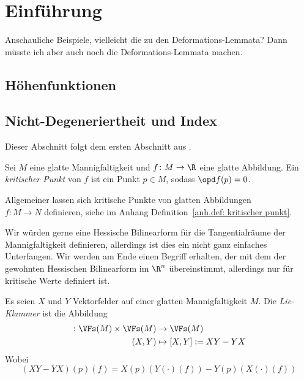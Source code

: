 \chapter{Einführung}

Anschauliche Beispiele, vielleicht die zu den Deformations-Lemmata? Dann müsste
ich aber auch noch die Deformations-Lemmata machen.

\section{Höhenfunktionen}

\section{Nicht-Degeneriertheit und Index}

Dieser Abschnitt folgt dem ersten Abschnitt aus \cite{milnor}.

\begin{definition}
    \label{def: kritischer Punkt}
    Sei $M$ eine glatte Mannigfaltigkeit und $f \colon M \to \R$ eine glatte Abbildung. 
    Ein \textit{kritischer Punkt} von $f$ ist ein Punkt $p \in M$, sodass $\opd f (p) = 0$.
\end{definition}

\begin{remark}
    Allgemeiner lassen sich kritische Punkte von glatten Abbildungen \\ $f \colon M \to N$ 
    definieren, siehe im Anhang Definition~\ref{anh.def: kritischer punkt}.
\end{remark}

Wir würden gerne eine Hessische Bilinearform für die Tangentialräume der Mannigfaltigkeit
definieren, allerdings ist dies ein nicht ganz einfaches Unterfangen. Wir werden am Ende
einen Begriff erhalten, der mit dem der gewohnten Hessischen Bilinearform im $\R^n$
übereinstimmt, allerdings nur für kritische Werte definiert ist.

\begin{definition}
    \label{def: lie-klammer}
    Es seien $X$ und $Y$ Vektorfelder auf einer glatten Mannigfaltigkeit $M$. Die 
    \textit{Lie-Klammer} ist die Abbildung 
    \begin{align*} 
        [\cdot, \cdot] \colon \VFs(M) \times \VFs(M) & \to \VFs(M) \\
        (X, Y) & \mapsto [X, Y] := XY - YX
    \end{align*}
    Wobei 
    \[ (XY - YX) (p) (f) = X(p)(Y(\cdot)(f)) - Y(p)(X(\cdot)(f)) \]
\end{definition}

